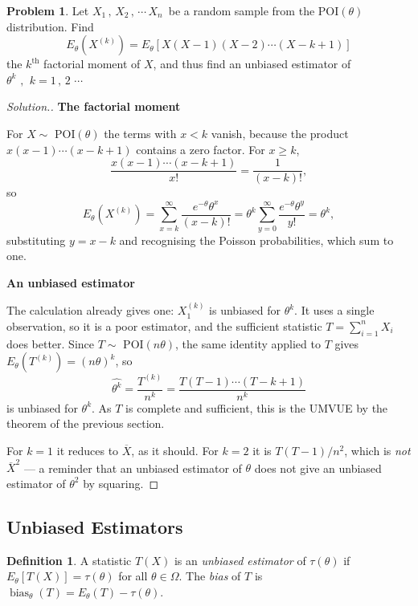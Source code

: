 \documentclass[12pt,a4paper]{report}
\theoremstyle{definition}
\newtheorem{defn}[thm]{Definition}
\newcommand{\subhead}[1]{%
  \par\medskip\noindent\textbf{#1}\par\nobreak\smallskip}
\DeclareMathOperator{\bias}{bias}
\newtheorem{problemx}{Problem}[section]
\newenvironment{problem}{\begin{problemx}}{\end{problemx}}
\newenvironment{solution}
  {\renewcommand{\qedsymbol}{}\begin{proof}[\textit{Solution}.]}
  {\end{proof}}
\begin{document}
\begin{problem}
Let $X_1\, , \, X_2\, ,\, \cdots \, X_n\,$ be a random sample from the POI$(\theta)$ distribution. Find
\[E_{\theta}\left(X^{(k)}\right) = E_{\theta}\left[X(X-1)(X-2)\cdots (X-k+1)\right]\]
the $k^{\text{th}}$ factorial moment of $X$, and thus find an unbiased estimator of $\theta^k\,\, , \,\ k = 1\,, \, 2\, \, \cdots $
\end{problem}

\begin{solution}
\subhead{The factorial moment}
For $X\sim$ POI$(\theta)$ the terms with $x<k$ vanish, because the product
$x(x-1)\cdots(x-k+1)$ contains a zero factor. For $x\geq k$,
\[\frac{x(x-1)\cdots(x-k+1)}{x!} = \frac{1}{(x-k)!},\]
so
\[E_{\theta}\left(X^{(k)}\right)
= \sum_{x=k}^{\infty} \frac{e^{-\theta}\theta^{x}}{(x-k)!}
= \theta^{k}\sum_{y=0}^{\infty}\frac{e^{-\theta}\theta^{y}}{y!}
= \theta^{k},\]
substituting $y=x-k$ and recognising the Poisson probabilities, which sum to one.

\subhead{An unbiased estimator}
The calculation already gives one: $X_1^{(k)}$ is unbiased for $\theta^{k}$. It
uses a single observation, so it is a poor estimator, and the sufficient
statistic $T=\sum_{i=1}^{n}X_i$ does better. Since $T\sim$ POI$(n\theta)$, the
same identity applied to $T$ gives $E_{\theta}\left(T^{(k)}\right) = (n\theta)^{k}$,
so
\[\widehat{\theta^{k}} = \frac{T^{(k)}}{n^{k}}
= \frac{T(T-1)\cdots(T-k+1)}{n^{k}}\]
is unbiased for $\theta^{k}$. As $T$ is complete and sufficient, this is the
UMVUE by the theorem of the previous section.

For $k=1$ it reduces to $\overline{X}$, as it should. For $k=2$ it is
$T(T-1)/n^{2}$, which is \emph{not} $\overline{X}^{2}$ --- a reminder that an
unbiased estimator of $\theta$ does not give an unbiased estimator of
$\theta^{2}$ by squaring.
\end{solution}

\subsection{Unbiased Estimators}

\begin{defn}
\label{def:unbiased}
A statistic $T(X)$ is an \emph{unbiased estimator} of $\tau(\theta)$ if
$E_\theta\left[T(X)\right] = \tau(\theta)$ for all $\theta\in\Omega$. The
\emph{bias} of $T$ is $\bias_\theta(T) = E_\theta(T) - \tau(\theta)$.
\end{defn}
\end{document}

